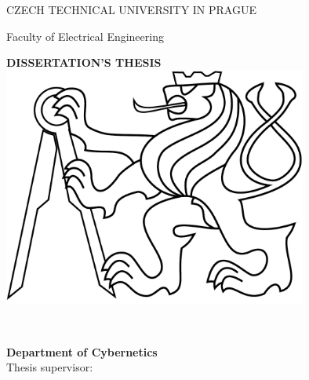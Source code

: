 \begin{titlepage}
\begin{center}

{\Large CZECH TECHNICAL UNIVERSITY IN PRAGUE}
\vskip 10pt

\vskip 8pt
{\Large Faculty of Electrical Engineering}
 
\vspace{50pt}
{\Huge\bf DISSERTATION'S THESIS}\\
\vspace{40pt}
\includegraphics[width=10cm]{fig/lev.pdf}

\vspace{40pt}
{\Large\rm \Author } \\
\vspace{20pt}
{\Large\bf \Title}

\vspace{60pt}
{\bf Department of Cybernetics}\\
\vspace{5pt}   
{Thesis supervisor: {\bf \Supervisor}}

\vspace{30pt}
\end{center}
\end{titlepage}
